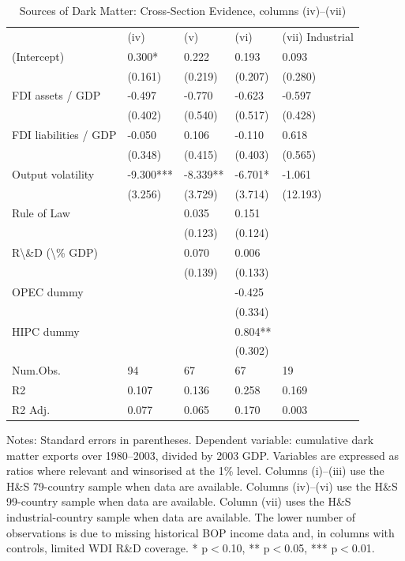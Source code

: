 \begin{table}[htbp]
\centering
\caption{Sources of Dark Matter: Cross-Section Evidence, columns (iv)--(vii)}
\label{tab:table3b}
\scriptsize
\begin{tabular}{lllll}
& (iv) & (v) & (vi) & (vii) Industrial \\
(Intercept) & 0.300* & 0.222 & 0.193 & 0.093 \\
& (0.161) & (0.219) & (0.207) & (0.280) \\
FDI assets / GDP & -0.497 & -0.770 & -0.623 & -0.597 \\
& (0.402) & (0.540) & (0.517) & (0.428) \\
FDI liabilities / GDP & -0.050 & 0.106 & -0.110 & 0.618 \\
& (0.348) & (0.415) & (0.403) & (0.565) \\
Output volatility & -9.300*** & -8.339** & -6.701* & -1.061 \\
& (3.256) & (3.729) & (3.714) & (12.193) \\
Rule of Law &  & 0.035 & 0.151 &  \\
&  & (0.123) & (0.124) &  \\
R\textbackslash{}\&D (\textbackslash{}\% GDP) &  & 0.070 & 0.006 &  \\
&  & (0.139) & (0.133) &  \\
OPEC dummy &  &  & -0.425 &  \\
&  &  & (0.334) &  \\
HIPC dummy &  &  & 0.804** &  \\
&  &  & (0.302) &  \\
Num.Obs. & 94 & 67 & 67 & 19 \\
R2 & 0.107 & 0.136 & 0.258 & 0.169 \\
R2 Adj. & 0.077 & 0.065 & 0.170 & 0.003 \\
\end{tabular}
\begin{minipage}{0.95\linewidth}
\footnotesize Notes: Standard errors in parentheses. Dependent variable: cumulative dark matter exports over 1980--2003, divided by 2003 GDP. Variables are expressed as ratios where relevant and winsorised at the 1\% level. Columns (i)--(iii) use the H\&S 79-country sample when data are available. Columns (iv)--(vi) use the H\&S 99-country sample when data are available. Column (vii) uses the H\&S industrial-country sample when data are available. The lower number of observations is due to missing historical BOP income data and, in columns with controls, limited WDI R\&D coverage. * p$<$0.10, ** p$<$0.05, *** p$<$0.01.
\end{minipage}
\end{table}
